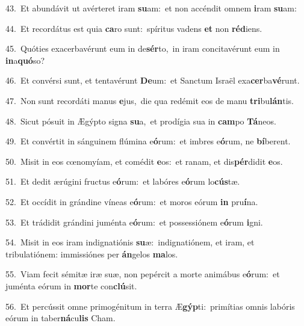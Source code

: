 {\numbfont\textcolor{\numbcolor}{43.}}~Et abundávit ut avérteret iram \textbf{su}\-am:~\star et non accéndit omnem \textbf{i}\-ram \textbf{su}\-am:\par
{\numbfont\textcolor{\numbcolor}{44.}}~Et recordátus est quia \textbf{ca}\-ro sunt:~\star spíritus vadens \textbf{et} non \textbf{réd}\-iens.\par
{\numbfont\textcolor{\numbcolor}{45.}}~Quóties exacerbavérunt eum in de\-\textbf{sér}\-to,~\star in iram concitavérunt eum in \textbf{in}\-a\-\textbf{quó}\-so?\par
{\numbfont\textcolor{\numbcolor}{46.}}~Et convérsi sunt, et tentavérunt \textbf{De}\-um:~\star et Sanctum Israël exa\-\textbf{cer}\-ba\-\textbf{vé}\-runt.\par
{\numbfont\textcolor{\numbcolor}{47.}}~Non sunt recordáti manus \textbf{e}\-jus,~\star die qua redémit eos de manu \textbf{tri}\-bu\-\textbf{lán}\-tis.\par
{\numbfont\textcolor{\numbcolor}{48.}}~Sicut pósuit in Ægýpto signa \textbf{su}\-a,~\star et prodígia sua in \textbf{cam}\-po \textbf{Tá}\-neos.\par
{\numbfont\textcolor{\numbcolor}{49.}}~Et convértit in sánguinem flúmina e\-\textbf{ó}\-rum:~\star et imbres e\-\textbf{ó}\-rum, ne \textbf{bí}\-berent.\par
{\numbfont\textcolor{\numbcolor}{50.}}~Misit in eos cœnomyíam, et comédit \textbf{e}\-os:~\star et ranam, et dis\-\textbf{pér}\-didit \textbf{e}\-os.\par
{\numbfont\textcolor{\numbcolor}{51.}}~Et dedit ærúgini fructus e\-\textbf{ó}\-rum:~\star et labóres e\-\textbf{ó}\-rum lo\-\textbf{cús}\-tæ.\par
{\numbfont\textcolor{\numbcolor}{52.}}~Et occídit in grándine víneas e\-\textbf{ó}\-rum:~\star et moros eórum \textbf{in} pru\-\textbf{í}\-na.\par
{\numbfont\textcolor{\numbcolor}{53.}}~Et trádidit grándini juménta e\-\textbf{ó}\-rum:~\star et possessiónem e\-\textbf{ó}\-rum \textbf{i}\-gni.\par
{\numbfont\textcolor{\numbcolor}{54.}}~Misit in eos iram indignatiónis \textbf{su}\-æ:~\star indignatiónem, et iram, et tribulatiónem: immissiónes per \textbf{án}\-gelos \textbf{ma}\-los.\par
{\numbfont\textcolor{\numbcolor}{55.}}~Viam fecit sémitæ iræ suæ, non pepércit a morte animábus e\-\textbf{ó}\-rum:~\star et juménta eórum in \textbf{mor}\-te con\-\textbf{clú}\-sit.\par
{\numbfont\textcolor{\numbcolor}{56.}}~Et percússit omne primogénitum in terra Æ\-\textbf{gýp}\-ti:~\star primítias omnis labóris eórum in taber\-\textbf{ná}\-cu\textbf{lis} Cham.\par
